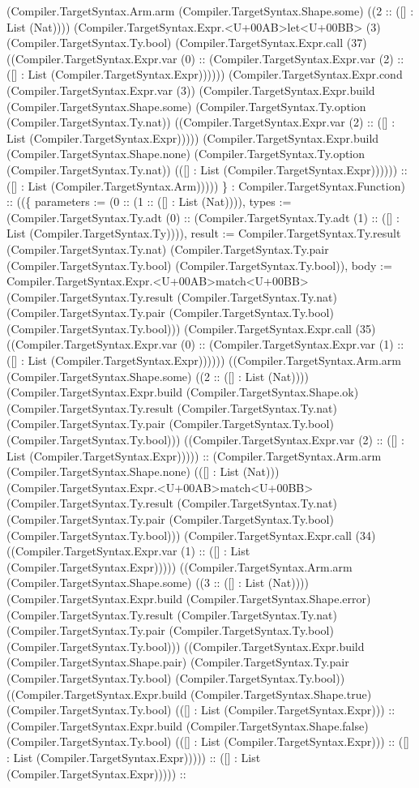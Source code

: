 \documentclass[11pt]{article}
\begin{document}
(Compiler.TargetSyntax.Arm.arm (Compiler.TargetSyntax.Shape.some) ((2 :: ([] : List (Nat)))) (Compiler.TargetSyntax.Expr.<U+00AB>let<U+00BB> (3) (Compiler.TargetSyntax.Ty.bool) (Compiler.TargetSyntax.Expr.call (37) ((Compiler.TargetSyntax.Expr.var (0) :: (Compiler.TargetSyntax.Expr.var (2) :: ([] : List (Compiler.TargetSyntax.Expr)))))) (Compiler.TargetSyntax.Expr.cond (Compiler.TargetSyntax.Expr.var (3)) (Compiler.TargetSyntax.Expr.build (Compiler.TargetSyntax.Shape.some) (Compiler.TargetSyntax.Ty.option (Compiler.TargetSyntax.Ty.nat)) ((Compiler.TargetSyntax.Expr.var (2) :: ([] : List (Compiler.TargetSyntax.Expr))))) (Compiler.TargetSyntax.Expr.build (Compiler.TargetSyntax.Shape.none) (Compiler.TargetSyntax.Ty.option (Compiler.TargetSyntax.Ty.nat)) (([] : List (Compiler.TargetSyntax.Expr)))))) :: ([] : List (Compiler.TargetSyntax.Arm))))) \} : Compiler.TargetSyntax.Function) :: ((\{ parameters := (0 :: (1 :: ([] : List (Nat)))), types := (Compiler.TargetSyntax.Ty.adt (0) :: (Compiler.TargetSyntax.Ty.adt (1) :: ([] : List (Compiler.TargetSyntax.Ty)))), result := Compiler.TargetSyntax.Ty.result (Compiler.TargetSyntax.Ty.nat) (Compiler.TargetSyntax.Ty.pair (Compiler.TargetSyntax.Ty.bool) (Compiler.TargetSyntax.Ty.bool)), body := Compiler.TargetSyntax.Expr.<U+00AB>match<U+00BB> (Compiler.TargetSyntax.Ty.result (Compiler.TargetSyntax.Ty.nat) (Compiler.TargetSyntax.Ty.pair (Compiler.TargetSyntax.Ty.bool) (Compiler.TargetSyntax.Ty.bool))) (Compiler.TargetSyntax.Expr.call (35) ((Compiler.TargetSyntax.Expr.var (0) :: (Compiler.TargetSyntax.Expr.var (1) :: ([] : List (Compiler.TargetSyntax.Expr)))))) ((Compiler.TargetSyntax.Arm.arm (Compiler.TargetSyntax.Shape.some) ((2 :: ([] : List (Nat)))) (Compiler.TargetSyntax.Expr.build (Compiler.TargetSyntax.Shape.ok) (Compiler.TargetSyntax.Ty.result (Compiler.TargetSyntax.Ty.nat) (Compiler.TargetSyntax.Ty.pair (Compiler.TargetSyntax.Ty.bool) (Compiler.TargetSyntax.Ty.bool))) ((Compiler.TargetSyntax.Expr.var (2) :: ([] : List (Compiler.TargetSyntax.Expr))))) :: (Compiler.TargetSyntax.Arm.arm (Compiler.TargetSyntax.Shape.none) (([] : List (Nat))) (Compiler.TargetSyntax.Expr.<U+00AB>match<U+00BB> (Compiler.TargetSyntax.Ty.result (Compiler.TargetSyntax.Ty.nat) (Compiler.TargetSyntax.Ty.pair (Compiler.TargetSyntax.Ty.bool) (Compiler.TargetSyntax.Ty.bool))) (Compiler.TargetSyntax.Expr.call (34) ((Compiler.TargetSyntax.Expr.var (1) :: ([] : List (Compiler.TargetSyntax.Expr))))) ((Compiler.TargetSyntax.Arm.arm (Compiler.TargetSyntax.Shape.some) ((3 :: ([] : List (Nat)))) (Compiler.TargetSyntax.Expr.build (Compiler.TargetSyntax.Shape.error) (Compiler.TargetSyntax.Ty.result (Compiler.TargetSyntax.Ty.nat) (Compiler.TargetSyntax.Ty.pair (Compiler.TargetSyntax.Ty.bool) (Compiler.TargetSyntax.Ty.bool))) ((Compiler.TargetSyntax.Expr.build (Compiler.TargetSyntax.Shape.pair) (Compiler.TargetSyntax.Ty.pair (Compiler.TargetSyntax.Ty.bool) (Compiler.TargetSyntax.Ty.bool)) ((Compiler.TargetSyntax.Expr.build (Compiler.TargetSyntax.Shape.true) (Compiler.TargetSyntax.Ty.bool) (([] : List (Compiler.TargetSyntax.Expr))) :: (Compiler.TargetSyntax.Expr.build (Compiler.TargetSyntax.Shape.false) (Compiler.TargetSyntax.Ty.bool) (([] : List (Compiler.TargetSyntax.Expr))) :: ([] : List (Compiler.TargetSyntax.Expr))))) :: ([] : List (Compiler.TargetSyntax.Expr))))) :: 
\end{document}
